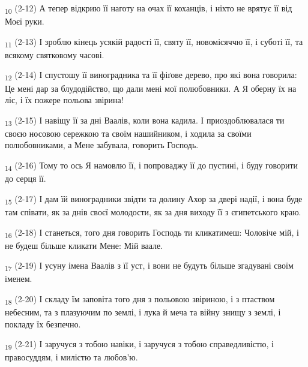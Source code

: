 \begin{tcolorbox}
\textsubscript{10} (2-12) А тепер відкрию її наготу на очах її коханців, і ніхто не врятує її від Моєї руки.
\end{tcolorbox}
\begin{tcolorbox}
\textsubscript{11} (2-13) І зроблю кінець усякій радості її, святу її, новомісяччю її, і суботі її, та всякому святковому часові.
\end{tcolorbox}
\begin{tcolorbox}
\textsubscript{12} (2-14) І спустошу її виноградника та її фіґове дерево, про які вона говорила: Це мені дар за блудодійство, що дали мені мої полюбовники. А Я оберну їх на ліс, і їх пожере польова звірина!
\end{tcolorbox}
\begin{tcolorbox}
\textsubscript{13} (2-15) І навіщу її за дні Ваалів, коли вона кадила. І приоздоблювалася ти своєю носовою сережкою та своїм нашийником, і ходила за своїми полюбовниками, а Мене забувала, говорить Господь.
\end{tcolorbox}
\begin{tcolorbox}
\textsubscript{14} (2-16) Тому то ось Я намовлю її, і попроваджу її до пустині, і буду говорити до серця її.
\end{tcolorbox}
\begin{tcolorbox}
\textsubscript{15} (2-17) І дам їй виноградники звідти та долину Ахор за двері надії, і вона буде там співати, як за днів своєї молодости, як за дня виходу її з єгипетського краю.
\end{tcolorbox}
\begin{tcolorbox}
\textsubscript{16} (2-18) І станеться, того дня говорить Господь ти кликатимеш: Чоловіче мій, і не будеш більше кликати Мене: Мій ваале.
\end{tcolorbox}
\begin{tcolorbox}
\textsubscript{17} (2-19) І усуну імена Ваалів з її уст, і вони не будуть більше згадувані своїм іменем.
\end{tcolorbox}
\begin{tcolorbox}
\textsubscript{18} (2-20) І складу їм заповіта того дня з польовою звіриною, і з птаством небесним, та з плазуючим по землі, і лука й меча та війну знищу з землі, і покладу їх безпечно.
\end{tcolorbox}
\begin{tcolorbox}
\textsubscript{19} (2-21) І заручуся з тобою навіки, і заручуся з тобою справедливістю, і правосуддям, і милістю та любов'ю.
\end{tcolorbox}

